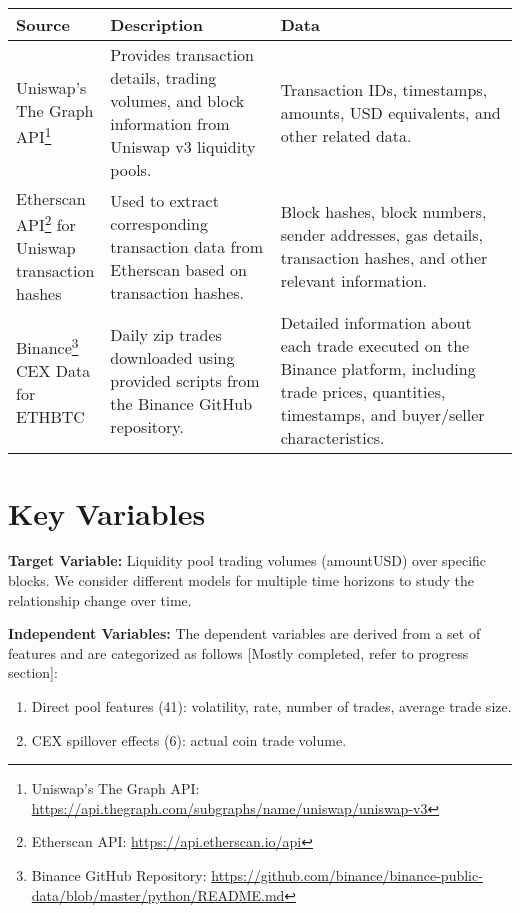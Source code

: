 \documentclass{article}
\begin{document}
{\begin{center}
\small
\begin{tabular}{|p{0.15\linewidth}|p{0.35\linewidth}|p{0.5\linewidth}|}
\hline
\textbf{Source} & \textbf{Description} & \textbf{Data} \\
\hline
Uniswap's The Graph API\footnote{Uniswap's The Graph API: \url{https://api.thegraph.com/subgraphs/name/uniswap/uniswap-v3}} & Provides transaction details, trading volumes, and block information from Uniswap v3 liquidity pools. & Transaction IDs, timestamps, amounts, USD equivalents, and other related data. \\
\hline
Etherscan API\footnote{Etherscan API: \url{https://api.etherscan.io/api}} for Uniswap transaction hashes & Used to extract corresponding transaction data from Etherscan based on transaction hashes. & Block hashes, block numbers, sender addresses, gas details, transaction hashes, and other relevant information. \\
\hline
Binance\footnote{Binance GitHub Repository: \url{https://github.com/binance/binance-public-data/blob/master/python/README.md}} CEX Data for ETHBTC & Daily zip trades downloaded using provided scripts from the Binance GitHub repository. & Detailed information about each trade executed on the Binance platform, including trade prices, quantities, timestamps, and buyer/seller characteristics. \\
\hline
\end{tabular}
\end{center}


\section*{Key Variables}
\textbf{Target Variable:} Liquidity pool trading volumes (amountUSD) over specific blocks. We consider different models for multiple time horizons to study the relationship change over time.

\textbf{Independent Variables:}
The dependent variables are derived from a set of features and are categorized as follows [Mostly completed, refer to progress section]:
\begin{enumerate}[label=\arabic*. ,itemsep=0pt, topsep=0pt]
\item Direct pool features (41): volatility, rate, number of trades, average trade size.
\item CEX spillover effects (6): actual coin trade volume.
\end{enumerate}

}
\end{document}
